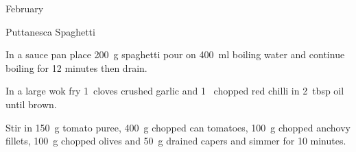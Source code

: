\begin{menu}{February}
\begin{recipe}{1}{Puttanesca Spaghetti}
    \begin{instructions}
    \item 
      In a
      sauce pan
      place
      200~g  spaghetti
      pour on
      400~ml  boiling water and continue boiling for 12 minutes then drain.
    \item 
        In a large wok fry
        1~cloves crushed garlic
        and
        1~ chopped red chilli
        in
        2~tbsp  oil
        until brown.
      \item 
        Stir in
        150~g  tomato puree,
        400~g chopped can tomatoes,
        100~g chopped anchovy fillets,
        100~g chopped olives
        and
        50~g drained capers
        and simmer for 10 minutes.
      
    \end{instructions}
    \end{recipe}%
  
    \clearpage
    \end{menu}
	
